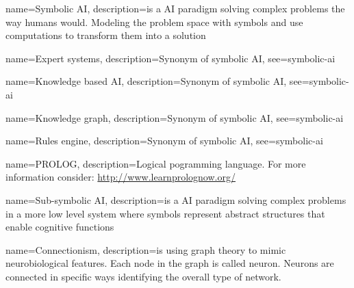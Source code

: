 




{
  name={Symbolic AI},
  description={is a AI paradigm solving complex problems the way humans would. Modeling the problem space with symbols and use computations to transform them into a solution}
}

{
  name={Expert systems},
  description={Synonym of symbolic AI},
  see={symbolic-ai}
}

{
  name={Knowledge based AI},
  description={Synonym of symbolic AI},
  see={symbolic-ai}
}

{
  name={Knowledge graph},
  description={Synonym of symbolic AI},
  see={symbolic-ai}
}

{
  name={Rules engine},
  description={Synonym of symbolic AI},
  see={symbolic-ai}
}

{
  name={PROLOG},
  description={Logical pogramming language. For more information consider: \url{http://www.learnprolognow.org/}}
}

{
  name={Sub-symbolic AI},
  description={is a AI paradigm solving complex problems in a more low level system where symbols represent abstract structures that enable cognitive functions}
}

{
  name={Connectionism},
  description={is using graph theory to mimic neurobiological features. Each node in the graph is called neuron. Neurons are connected in specific ways identifying the overall type of network.}
}